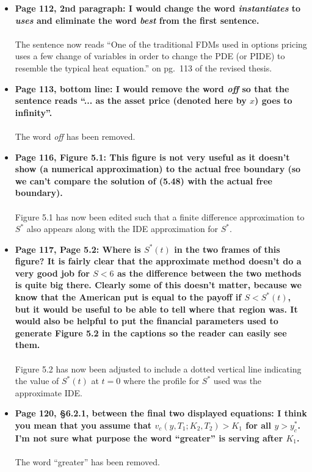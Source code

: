 \documentclass{article}
\begin{document}
\begin{enumerate}
\begin{itemize}
			\item{\textbf{Page 112, 2nd paragraph:  I would change the word \emph{instantiates} to \emph{uses} and eliminate the word \emph{best} from the first sentence.
			\\\\}}
			The sentence now reads ``One of the traditional FDMs used in options pricing uses a few change of variables in order to change the PDE (or PIDE) to resemble the typical heat equation.'' on pg.~113 of the revised thesis.
			
			\item{\textbf{Page 113, bottom line:  I would remove the word \emph{off} so that the sentence reads ``... as the asset price (denoted here by $x$) goes to infinity''.
			\\\\}}
			The word \emph{off} has been removed.
			
			\item{\textbf{Page 116, Figure 5.1:  This figure is not very useful as it doesn't show (a numerical approximation) to the actual free boundary (so we can't compare the solution of (5.48) with the actual free boundary).
			\\\\}}
			Figure 5.1 has now been edited such that a finite difference approximation to $S^*$ also appears along with the IDE approximation for $S^*$.
			
			\item{\textbf{Page 117, Page 5.2:  Where is $S^*(t)$ in the two frames of this figure? It is fairly clear that the approximate method doesn't do a very good job for $S< 6$ as the difference between the two methods is quite big there. Clearly some of this doesn't matter, because we know that the American put is equal to the payoff if $S < S^*(t)$, but it would be useful to be able to tell where that region was. It would also be helpful to put the financial parameters used to generate Figure 5.2 in the captions so the reader can easily see them.
			\\\\}}
			Figure 5.2 has now been adjusted to include a dotted vertical line indicating the value of $S^*(t)$ at $t=0$ where the profile for $S^*$ used was the approximate IDE.
			\item{\textbf{Page 120, \S6.2.1, between the final two displayed equations:  I think you mean that you assume that $v_c(y,T_1; K_2, T_2) > K_1$ for all $y > y_c^*$. I'm not sure what purpose the word ``greater'' is serving after $K_1$.
			\\\\}}
			The word ``greater'' has been removed.
			

\end{itemize}
\end{enumerate}
\end{document}
